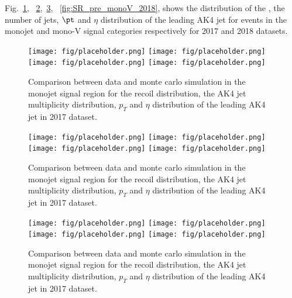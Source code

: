 {Fig.~\ref{fig:SR_pre_monojet_2017}, ~\ref{fig:SR_pre_monoV_2017},~\ref{fig:SR_pre_monojet_2018}, ~\ref{fig:SR_pre_monoV_2018},
shows the distribution of the \ETmiss, the number of
jets, $\pt$ and $\eta$ distribution of the leading AK4 jet for events
in the monojet and mono-V signal categories respectively for 2017 and 2018 datasets.

\begin{figure}[htbp]
    \begin{center}
        \texttt{[image: fig/placeholder.png]}
        \texttt{[image: fig/placeholder.png]} \\
        \texttt{[image: fig/placeholder.png]}
        \texttt{[image: fig/placeholder.png]}
    \end{center}
    \caption{Comparison between data and monte carlo simulation in the monojet signal region for
        the recoil distribution, the AK4 jet multiplicity distribution,  $p_T$ and $\eta$
        distribution of the leading AK4  jet in 2017 dataset.}
    \label{fig:SR_pre_monojet_2017}
\end{figure}

\begin{figure}[htbp]
    \begin{center}
        \texttt{[image: fig/placeholder.png]}
        \texttt{[image: fig/placeholder.png]} \\
        \texttt{[image: fig/placeholder.png]}
        \texttt{[image: fig/placeholder.png]}
    \end{center}
    \caption{Comparison between data and monte carlo simulation in the monojet signal region for
        the recoil distribution, the AK4 jet multiplicity distribution,  $p_T$ and $\eta$
        distribution of the leading AK4  jet in 2017 dataset.}
    \label{fig:SR_pre_monoV_2017}
\end{figure}

\begin{figure}[htbp]
    \begin{center}
        \texttt{[image: fig/placeholder.png]}
        \texttt{[image: fig/placeholder.png]} \\
        \texttt{[image: fig/placeholder.png]}
        \texttt{[image: fig/placeholder.png]}
    \end{center}
    \caption{Comparison between data and monte carlo simulation in the monojet signal region for
        the recoil distribution, the AK4 jet multiplicity distribution,  $p_T$ and $\eta$
        distribution of the leading AK4  jet in 2017 dataset.}
    \label{fig:SR_pre_monojet_2018}
\end{figure}

}
